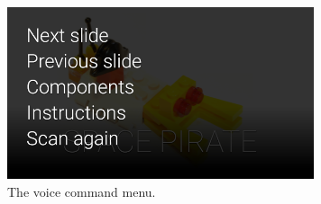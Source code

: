 	\begin{figure}[ht!]
		\centering
		\includegraphics[width=90mm]{images/demo/glassVoiceCommand}
		\caption{The voice command menu.}
		\label{glassDemoVoiceCommand}
	\end{figure}


